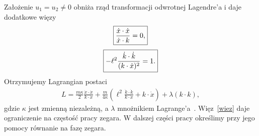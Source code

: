 Założenie 
$u_1 = u_2 \neq 0$ obniża rząd transformacji 
odwrotnej Lagendre'a i daje dodatkowe więzy 
\begin{align}\boxed{
\label{wiezD}
\frac{\dot{x}\cdot\dot{x}}{\dot{x}\cdot k}=0, 
}
\end{align}
\begin{align} 
\boxed{
\label{wiez}
 - \ell^2 \frac{\dot{k} \cdot \dot{k}}{ ( k \cdot \dot{x})^2 } = 1 .
}
\end{align}
Otrzymujemy Lagrangian postaci
\begin{align*}\boxed{
L  = \frac{m \kappa}{2} \frac{\dot{x}\cdot\dot{x}}{k\cdot\dot{x}}
+ \frac{m }{4 \kappa} 
 \left( \ell^2 \frac{\dot{k} \cdot \dot{k}}{  k \cdot \dot{x} } + 
k\cdot\dot{x} \right) + \lambda (k\cdot k),}
\end{align*}
gdzie $\kappa$ jest zmienną niezależną, a $\lambda$ 
mnożnikiem Lagrange'a~\cite{Bratek2015wiele}.
Więz~\eqref{wiez} daje ograniczenie na częstość pracy zegara. 
W dalszej części pracy określimy przy jego pomocy równanie na 
fazę zegara.

%
%
%
%

